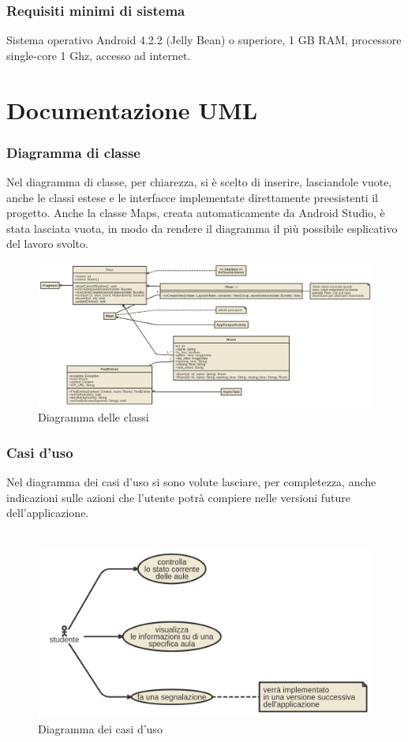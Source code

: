 \documentclass{article}
\begin{document}
	\section{Requisiti minimi di sistema}
	Sistema operativo Android 4.2.2 (Jelly Bean) o superiore, 1 GB RAM, processore single-core 1 Ghz, accesso ad internet.
	\newpage
	\part{Documentazione UML}
	\section{Diagramma di classe}
	Nel diagramma di classe, per chiarezza, si è scelto di inserire,  lasciandole vuote, anche le classi estese e le interfacce implementate direttamente preesistenti il progetto. Anche la classe Maps, creata automaticamente da Android Studio, è stata lasciata vuota, in modo da rendere il diagramma il più possibile esplicativo del lavoro svolto.
	\begin{figure}[h]
		\includegraphics[width=\textwidth]{class}
		\centering
		\caption{Diagramma delle classi}
	\end{figure}
	\newpage
	\section{Casi d'uso}
	Nel diagramma dei casi d'uso si sono volute lasciare, per completezza, anche indicazioni sulle azioni che l'utente potrà compiere nelle versioni future dell'applicazione.\\\\
	\begin{figure}[h]
		\includegraphics[width=\textwidth]{casiduso}
		\centering
		\caption{Diagramma dei casi d'uso}
	\end{figure}
	\newpage
\end{document}
